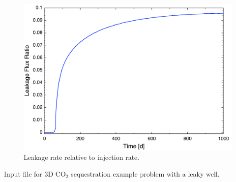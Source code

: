 \begin{figure}[h]\centering
\includegraphics[scale=0.35]{./figs/leakage_flx}
\caption{Leakage rate relative to injection rate.}\label{fleaky_flx}
\end{figure}

\clearpage

\begin{table}[h]
\caption{Input file for 3D CO$_2$ sequestration example problem with a leaky well.}
\end{table}
\scriptsize
{}\label{tleaky-co2in}
\normalsize

\newpage
